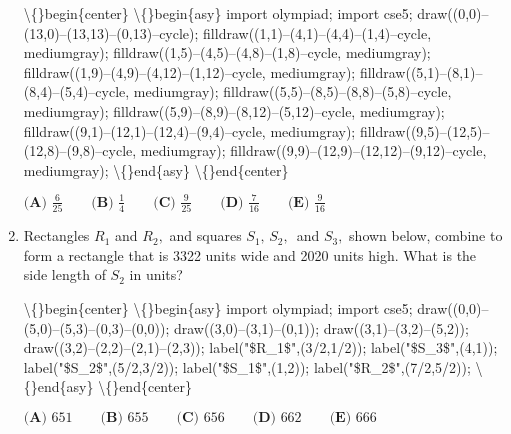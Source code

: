 \documentclass{article}
\begin{document}
\begin{enumerate}[label=\arabic*., itemsep=0.5em]
\textbackslash\{\}begin\{center\}
\textbackslash\{\}begin\{asy\}
import olympiad;
import cse5;
draw((0,0)--(13,0)--(13,13)--(0,13)--cycle);
filldraw((1,1)--(4,1)--(4,4)--(1,4)--cycle, mediumgray);
filldraw((1,5)--(4,5)--(4,8)--(1,8)--cycle, mediumgray);
filldraw((1,9)--(4,9)--(4,12)--(1,12)--cycle, mediumgray);
filldraw((5,1)--(8,1)--(8,4)--(5,4)--cycle, mediumgray);
filldraw((5,5)--(8,5)--(8,8)--(5,8)--cycle, mediumgray);
filldraw((5,9)--(8,9)--(8,12)--(5,12)--cycle, mediumgray);
filldraw((9,1)--(12,1)--(12,4)--(9,4)--cycle, mediumgray);
filldraw((9,5)--(12,5)--(12,8)--(9,8)--cycle, mediumgray);
filldraw((9,9)--(12,9)--(12,12)--(9,12)--cycle, mediumgray);
\textbackslash\{\}end\{asy\}
\textbackslash\{\}end\{center\}


\(\textbf{(A) }\frac6{25} \qquad \textbf{(B) }\frac14 \qquad \textbf{(C) }\frac9{25} \qquad \textbf{(D) }\frac7{16} \qquad \textbf{(E) }\frac9{16}\)\par \vspace{0.5em}\item Rectangles \(R_1\) and \(R_2,\) and squares \(S_1,\,S_2,\,\) and \(S_3,\) shown below, combine to form a rectangle that is 3322 units wide and 2020 units high. What is the side length of \(S_2\) in units?


\textbackslash\{\}begin\{center\}
\textbackslash\{\}begin\{asy\}
import olympiad;
import cse5;
draw((0,0)--(5,0)--(5,3)--(0,3)--(0,0));
draw((3,0)--(3,1)--(0,1));
draw((3,1)--(3,2)--(5,2));
draw((3,2)--(2,2)--(2,1)--(2,3));
label("\$R\_1\$",(3/2,1/2));
label("\$S\_3\$",(4,1));
label("\$S\_2\$",(5/2,3/2));
label("\$S\_1\$",(1,2));
label("\$R\_2\$",(7/2,5/2));
\textbackslash\{\}end\{asy\}
\textbackslash\{\}end\{center\}


\(\textbf{(A) }651 \qquad \textbf{(B) }655 \qquad \textbf{(C) }656 \qquad \textbf{(D) }662 \qquad \textbf{(E) }666\)\par \vspace{0.5em}\end{enumerate}
\end{document}
